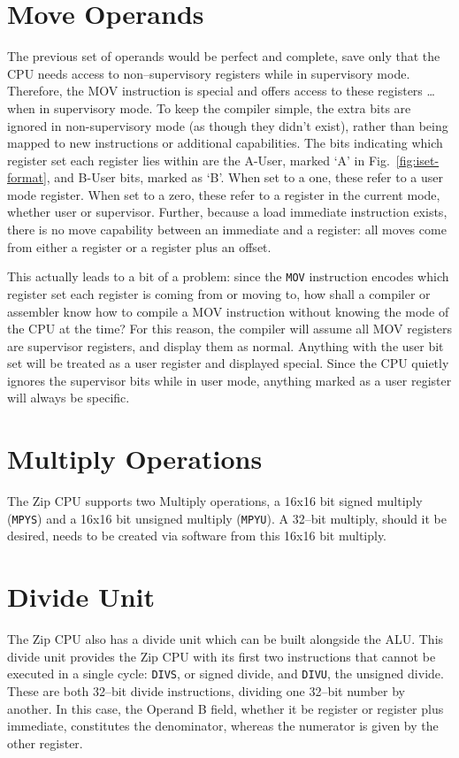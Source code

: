 \documentclass{gqtekspec}
\begin{document}
\section{Move Operands}
The previous set of operands would be perfect and complete, save only that
the CPU needs access to non--supervisory registers while in supervisory mode. 
Therefore, the MOV instruction is special and offers access to these registers
\ldots when in supervisory mode.  To keep the compiler simple, the extra bits
are ignored in non-supervisory mode (as though they didn't exist), rather than
being mapped to new instructions or additional capabilities.  The bits
indicating which register set each register lies within are the A-User, marked
`A' in Fig.~\ref{fig:iset-format}, and B-User bits, marked as `B'.  When set
to a one, these refer to a user mode register.  When set to a zero, these
refer to a register in the current mode, whether user or supervisor.  Further,
because a load immediate instruction exists, there is no move capability
between an immediate and a register: all moves come from either a register or
a register plus an offset.

This actually leads to a bit of a problem: since the {\tt MOV} instruction
encodes which register set each register is coming from or moving to, how shall
a compiler or assembler know how to compile a MOV instruction without knowing
the mode of the CPU at the time?  For this reason, the compiler will assume
all MOV registers are supervisor registers, and display them as normal. 
Anything with the user bit set will be treated as a user register and displayed
special.  Since the CPU quietly ignores the supervisor bits while in user mode,
anything marked as a user register will always be specific.

\section{Multiply Operations}
The Zip CPU supports two Multiply operations, a 16x16 bit signed multiply
({\tt MPYS}) and a 16x16 bit unsigned multiply ({\tt MPYU}).  A 32--bit
multiply, should it be desired, needs to be created via software from this
16x16 bit multiply.

\section{Divide Unit}
The Zip CPU also has a divide unit which can be built alongside the ALU.
This divide unit provides the Zip CPU with its first two instructions that
cannot be executed in a single cycle: {\tt DIVS}, or signed divide, and
{\tt DIVU}, the unsigned divide.  These are both 32--bit divide instructions,
dividing one 32--bit number by another.  In this case, the Operand B field,
whether it be register or register plus immediate, constitutes the denominator,
whereas the numerator is given by the other register.
\end{document}
